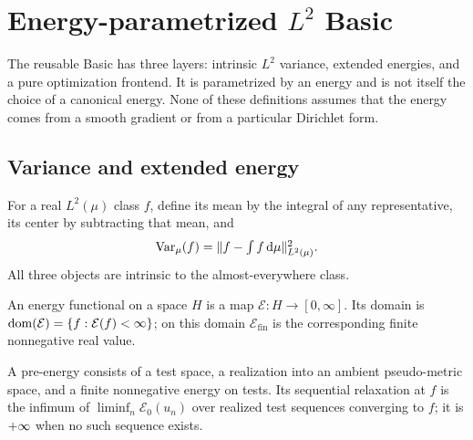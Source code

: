 \chapter{Energy-parametrized \texorpdfstring{$L^2$}{L2} Basic}
\label{chap:canonical-basic}

The reusable Basic has three layers: intrinsic $L^2$ variance, extended energies, and a pure
optimization frontend.  It is parametrized by an energy and is not itself the choice of a
canonical energy.  None of these definitions assumes that the energy comes from a smooth gradient
or from a particular Dirichlet form.

\section{Variance and extended energy}

\begin{definition}
  \label{def:l2-mean-variance}
  \leanok
  For a real $L^2(\mu)$ class $f$, define its mean by the integral of any representative, its
  center by subtracting that mean, and
  \[
    \operatorname{Var}_\mu(f)=\lVert f-\textstyle\int f\,\mathrm d\mu\rVert_{L^2(\mu)}^2.
  \]
  All three objects are intrinsic to the almost-everywhere class.
\end{definition}

\begin{definition}
  \label{def:extended-energy}
  \leanok
  An energy functional on a space $H$ is a map $\mathcal E:H\to[0,\infty]$.  Its domain is
  $\operatorname{dom}(\mathcal E)=\{f:\mathcal E(f)<\infty\}$; on this domain
  $\mathcal E_{\mathrm{fin}}$ is the corresponding finite nonnegative real value.
\end{definition}

\begin{definition}
  \label{def:preenergy-relaxation}
  \leanok
  A pre-energy consists of a test space, a realization into an ambient pseudo-metric space, and a
  finite nonnegative energy on tests.  Its sequential relaxation at $f$ is the infimum of
  $\liminf_n\mathcal E_0(u_n)$ over realized test sequences converging to $f$; it is
  $+\infty$ when no such sequence exists.
\end{definition}

